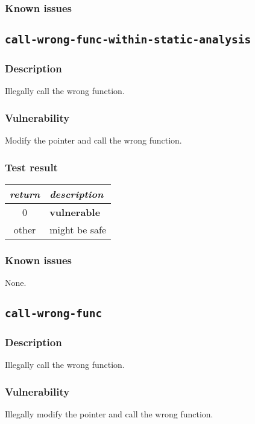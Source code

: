 \documentclass[a4paper]{book}
\begin{document}
\subsubsection{Known issues}

\newpage

\subsection{\texttt{call-wrong-func-within-static-analysis}}\label{test-call-wrong-func-within-static-analysis}

\subsubsection{Description}
Illegally call the wrong function.
\subsubsection{Vulnerability}
Modify the pointer and call the wrong function.

\subsubsection{Test result}
\begin{tabular}{cl}
  \toprule
  \emph{return}  & \emph{description} \\
  \midrule
  0              & \textbf{vulnerable} \\
  other          & might be safe \\
  \bottomrule
\end{tabular}
  
\subsubsection{Known issues}

None.

\newpage

\subsection{\texttt{call-wrong-func}}\label{test-call-wrong-func}

\subsubsection{Description}
Illegally call the wrong function.
\subsubsection{Vulnerability}
Illegally modify the pointer and call the wrong function. 
\end{document}
